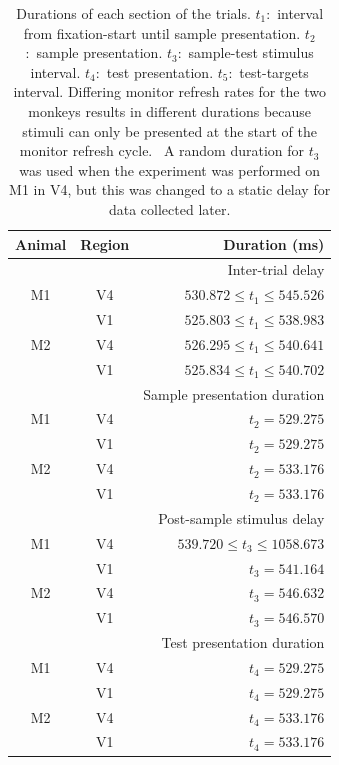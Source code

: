 \begin{table}[hbtp]
\caption{Durations of each section of the trials.
$t_1$:~interval from fixation-start until sample presentation.
$t_2$:~sample presentation.
$t_3$:~sample-test stimulus interval.
$t_4$:~test presentation.
$t_5$:~test-targets interval.
Differing monitor refresh rates for the two monkeys results in different durations because stimuli can only be presented at the start of the monitor refresh cycle.
\NB{}~A random duration for $t_3$ was used when the experiment was performed on \ac{M1} in \ac{V4}, but this was changed to a static delay for data collected later.}
\label{tab:tptimes}
\begin{center}
%
\begin{tabular}{ccr}
\toprule
Animal  & Region    & Duration (\si{\milli\second}) \\
\midrule
        &           & Inter-trial delay \\
\midrule
M1      & V4        & $530.872 \le t_1 \le 545.526$ \\
        & V1        & $525.803 \le t_1 \le 538.983$ \\
M2      & V4        & $526.295 \le t_1 \le 540.641$ \\
        & V1        & $525.834 \le t_1 \le 540.702$ \\
\midrule
        &           & Sample presentation duration \\
\midrule
M1      & V4        & $t_2 = 529.275$ \\
        & V1        & $t_2 = 529.275$ \\
M2      & V4        & $t_2 = 533.176$ \\
        & V1        & $t_2 = 533.176$ \\
\midrule
        &           & Post-sample stimulus delay \\
\midrule
M1      & V4        & $539.720 \le t_3 \le 1058.673$ \\
        & V1        & $t_3 = 541.164$ \\
M2      & V4        & $t_3 = 546.632$ \\
        & V1        & $t_3 = 546.570$ \\
\midrule
        &           & Test presentation duration \\
\midrule
M1      & V4        & $t_4 = 529.275$ \\
        & V1        & $t_4 = 529.275$ \\
M2      & V4        & $t_4 = 533.176$ \\
        & V1        & $t_4 = 533.176$ \\

\end{tabular}
\end{center}
\end{table}
